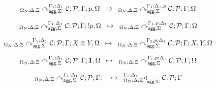 
\[
\trans{
   \derstatea{\Delta}{\Xi}{\Gamma_1}{\Delta_1}{\Sigma}{\lstack{C};
      \lstack{P}}{p, \Omega}
}
{
   \derstatea{\Delta}{\Xi}{\Gamma_1}{\Delta_1, p}{\Sigma}{\lstack{C};
      \lstack{P}}{\Omega}
}
\]

\[
\trans{
   \derstatea{\Delta}{\Xi}{\Gamma_1}{\Delta_1}{\Sigma}{\lstack{C};
      \lstack{P}}{\bang p, \Omega}
}
{
   \derstatea{\Delta}{\Xi}{\Gamma_1, p}{\Delta_1}{\Sigma}{\lstack{C};
      \lstack{P}}{\Omega}
}
\]

\[
\trans{
   \derstatea{\Delta}{\Xi}{\Gamma_1}{\Delta_1}{\Sigma}{\lstack{C};
      \lstack{P}}{X \otimes Y, \Omega}
}
{
   \derstatea{\Delta}{\Xi}{\Gamma_1, p}{\Delta_1}{\Sigma}{\lstack{C};
      \lstack{P}}{X, Y, \Omega}
}
\]

\[
\trans{
   \derstatea{\Delta}{\Xi}{\Gamma_1}{\Delta_1}{\Sigma}{\lstack{C};
      \lstack{P}}{\one, \Omega}
}
{
   \derstatea{\Delta}{\Xi}{\Gamma_1, p}{\Delta_1}{\Sigma}{\lstack{C};
      \lstack{P}}{\Omega}
}
\]

\[
\trans{
   \derstatea{\Delta}{\Xi}{\Gamma_1}{\Delta_1}{\Sigma}{\lstack{C};
      \lstack{P}}{\cdot}
}
{
   \contstatea{\Delta}{\lstack{C} ; \lstack{P}}{\Gamma}{\Sigma}
}
\]
